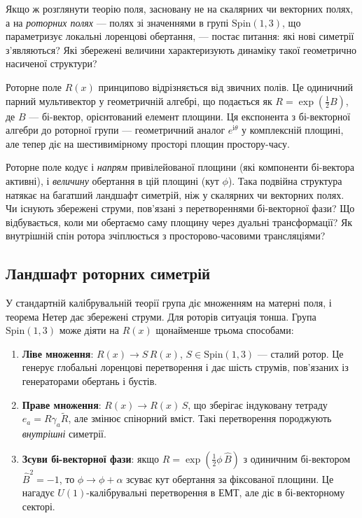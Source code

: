 \documentclass[11pt,a4paper]{article}
\numberwithin{equation}{section}
\theoremstyle{plain}
\theoremstyle{definition}
\theoremstyle{remark}
\newcommand{\ii}{\mathrm{i}}
\begin{document}
Якщо ж розглянути теорію поля, засновану не на скалярних чи векторних полях, а на \emph{роторних полях} — полях зі значеннями в групі $\mathrm{Spin}(1,3)$, що параметризує локальні лоренцові обертання, — постає питання: які нові симетрії з’являються? Які збережені величини характеризують динаміку такої геометрично насиченої структури?

Роторне поле $R(x)$ принципово відрізняється від звичних полів. Це одиничний парний мультивектор у геометричній алгебрі, що подається як $R=\exp(\frac{1}{2}B)$, де $B$ — бі-вектор, орієнтований елемент площини. Ця експонента з бі-векторної алгебри до роторної групи — геометричний аналог $e^{\ii\theta}$ у комплексній площині, але тепер діє на шестивимірному просторі площин простору-часу.

Роторне поле кодує і \emph{напрям} привілейованої площини (які компоненти бі-вектора активні), і \emph{величину} обертання в цій площині (кут $\phi$). Така подвійна структура натякає на багатший ландшафт симетрій, ніж у скалярних чи векторних полях. Чи існують збережені струми, пов’язані з перетвореннями бі-векторної фази? Що відбувається, коли ми обертаємо саму площину через дуальні трансформації? Як внутрішній спін ротора зчіплюється з просторово-часовими трансляціями?

\subsection{Ландшафт роторних симетрій}

У стандартній калібрувальній теорії група діє множенням на матерні поля, і теорема Нетер дає збережені струми. Для роторів ситуація тонша. Група $\mathrm{Spin}(1,3)$ може діяти на $R(x)$ щонайменше трьома способами:

\begin{enumerate}
  \item \textbf{Ліве множення}: $R(x) \to S\,R(x)$, $S \in \mathrm{Spin}(1,3)$ — сталий ротор. Це генерує глобальні лоренцові перетворення і дає шість струмів, пов’язаних із генераторами обертань і бустів.

  \item \textbf{Праве множення}: $R(x) \to R(x)\,S$, що зберігає індуковану тетраду $e_a=R\gamma_a\widetilde{R}$, але змінює спінорний вміст. Такі перетворення породжують \emph{внутрішні} симетрії.

  \item \textbf{Зсуви бі-векторної фази}: якщо $R=\exp(\frac{1}{2}\phi\,\hat{B})$ з одиничним бі-вектором $\hat{B}^2=-1$, то $\phi\to\phi+\alpha$ зсуває кут обертання за фіксованої площини. Це нагадує $U(1)$-калібрувальні перетворення в ЕМТ, але діє в бі-векторному секторі.
\end{enumerate}
\end{document}
